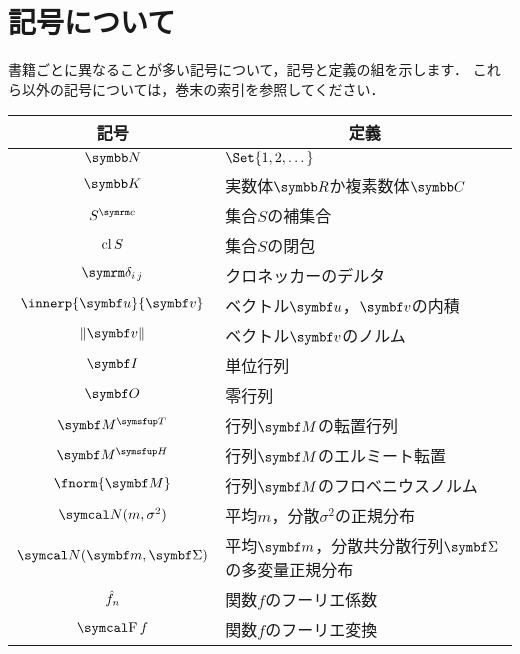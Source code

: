 \documentclass[../../main]{subfiles}
\begin{document}
\chapter{記号について}
\thispagestyle{empty}
書籍ごとに異なることが多い記号について，記号と定義の組を示します．
これら以外の記号については，巻末の索引を参照してください．

\vspace*{\fill}
\begin{table*}
  \centering
  \begin{tabular}{c|l} \hline
    記号 & \multicolumn{1}{c}{定義} \\ \hline
    \(\numset{N}\) & \(\Set{1,2,\dotsc}\) \\
    \(\numset{K}\) & 実数体\(\numset{R}\)か複素数体\(\numset{C}\) \\
    \(\scomp{S}\) & 集合\(S\)の補集合 \\
    \(\operatorname{cl} S\) & 集合\(S\)の閉包 \\
    \(\ddelta{i}{j}\) & クロネッカーのデルタ \\
    \(\innerp{\vect{u}}{\vect{v}}\) & ベクトル\(\vect{u}\)，\(\vect{v}\)の内積 \\
    \(\vnorm{\vect{v}}\) & ベクトル\(\vect{v}\)のノルム \\
    \(\imat\) & 単位行列 \\
    \(\zmat\) & 零行列 \\
    \(\trps{\mat{M}}\) & 行列\(\mat{M}\)の転置行列 \\
    \(\htrps{\mat{M}}\) & 行列\(\mat{M}\)のエルミート転置 \\
    \(\fnorm{\mat{M}}\) & 行列\(\mat{M}\)のフロベニウスノルム \\
    \(\ndist(m,\sigma^2)\) & 平均\(m\)，分散\(\sigma^2\)の正規分布 \\
    \(\ndist(\vect{m},\mat{\Sigma})\) & 平均\(\vect{m}\)，分散共分散行列\(\mat{\Sigma}\)の多変量正規分布 \\
    \(\hat{f}_n\) & 関数\(f\)のフーリエ係数 \\
    \(\ftrans f\) & 関数\(f\)のフーリエ変換 \\ \hline
  \end{tabular}
\end{table*}
\vspace*{\fill}
\end{document}
